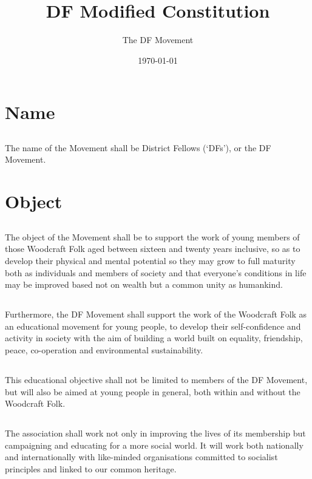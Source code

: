 \documentclass[a4paper, 12pt]{article}
\title{DF Modified Constitution}
\author{The DF Movement}
\date{\today}
\begin{document}
\maketitle
\tableofcontents

\section{Name}
\subsection{}
The name of the Movement shall be District Fellows (`DFs'), or the DF Movement.

\section{Object}
\subsection{}
The object of the Movement shall be to support the work of young members of those Woodcraft Folk aged between sixteen and twenty years inclusive, so as to develop their physical and mental potential so they may grow to full maturity both as individuals and members of society and that everyone's conditions in life may be improved based not on wealth but a common unity as humankind.
\subsection{}
Furthermore, the DF Movement shall support the work of the Woodcraft Folk as an educational movement for young people, to develop their self-confidence and activity in society with the aim of building a world built on equality, friendship, peace, co-operation and environmental sustainability. 
\subsection{}
This educational objective shall not be limited to members of the DF Movement, but will also be aimed at young people in general, both within and without the Woodcraft Folk.
\subsection{}
The association shall work not only in improving the lives of its membership but campaigning and educating for a more social world. It will work both nationally and internationally with like-minded organisations committed to socialist principles and linked to our common heritage.
\end{document}
